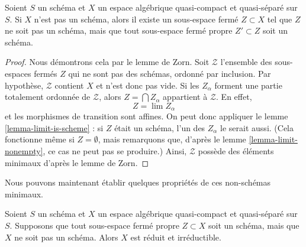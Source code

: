 \begin{lemma}
\label{lemma-minimal-closed-subspace}
Soient $S$ un schéma et $X$ un espace algébrique quasi-compact et quasi-séparé
sur $S$. Si $X$ n'est pas un schéma, alors il existe
un sous-espace fermé $Z \subset X$ tel que $Z$ ne soit pas un schéma, mais que
tout sous-espace fermé propre $Z' \subset Z$ soit un schéma.
\end{lemma}

\begin{proof}
Nous démontrons cela par le lemme de Zorn. Soit $\mathcal{Z}$ l'ensemble
des sous-espaces fermés $Z$ qui ne sont pas des schémas, ordonné par inclusion.
Par hypothèse, $\mathcal{Z}$ contient $X$ et n'est donc pas vide.
Si les $Z_\alpha$ forment une partie totalement ordonnée de $\mathcal{Z}$, alors
$Z = \bigcap Z_\alpha$ appartient à $\mathcal{Z}$. En effet,
$$
Z = \lim Z_\alpha
$$
et les morphismes de transition sont affines.
On peut donc appliquer le lemme \ref{lemma-limit-is-scheme} : si $Z$
était un schéma, l'un des $Z_\alpha$ le serait aussi.
(Cela fonctionne même si $Z = \emptyset$, mais remarquons que, d'après le
lemme \ref{lemma-limit-nonempty}, ce cas ne peut pas se produire.)
Ainsi, $\mathcal{Z}$ possède des éléments minimaux d'après le lemme de Zorn.
\end{proof}

\noindent
Nous pouvons maintenant établir quelques propriétés de ces non-schémas minimaux.

\begin{lemma}
\label{lemma-minimal-nonscheme}
Soient $S$ un schéma et $X$ un espace algébrique quasi-compact et quasi-séparé
sur $S$. Supposons que tout sous-espace fermé propre
$Z \subset X$ soit un schéma, mais que $X$ ne soit pas un schéma. Alors $X$ est réduit
et irréductible.
\end{lemma}

